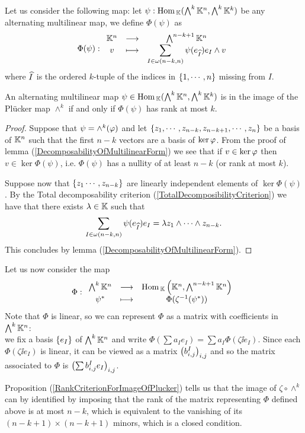 \noindent Let us consider the following map: let $\psi:\mathrm{Hom}\,_{\mathbb{K}}(\bigwedge^k\mathbb{K}^n,\bigwedge^k\mathbb{K}^k)$ be any alternating multilinear map, we define $\Phi(\psi)$ as
\[\Phi(\psi):\begin{array}{ccc} {\mathbb{K}^n} & \longrightarrow & {\bigwedge^{n-k+1}\mathbb{K}^n}\\ {v} & \longmapsto & {\displaystyle\sum_{I\in \omega(n-k,n)}\psi(e_{\widehat{I}})e_I\wedge v} \end{array}\]
where $\widehat{I}$ is the ordered $k$-tuple of the indices in $\left\{{1,\cdots, n}\right\}$ missing from $I$.



\begin{proposition}\label{RankCriterionForImageOfPlucker}
An alternating multilinear map $\psi\in \mathrm{Hom}\,_{\mathbb{K}}(\bigwedge^k\mathbb{K}^n,\bigwedge^k\mathbb{K}^k)$ is in the image of the Pl\"ucker map $\wedge^k$ if and only if $\Phi(\psi)$ has rank at most $k$.
\end{proposition}
\begin{proof}
Suppose that $\psi=\wedge^k(\varphi)$ and let $\left\{{z_1,\cdots, z_{n-k},z_{n-k+1},\cdots, z_{n}}\right\}$ be a basis of $\mathbb{K}^n$ such that the first $n-k$ vectors are a basis of $\ker \varphi$. From the proof of lemma (\ref{DecomposabilityOfMultilinearForm}) we see that if $v\in \ker \varphi$ then $v\in \ker \Phi(\psi)$, i.e. $\Phi(\psi)$ has a nullity of at least $n-k$ (or rank at most $k$).
\medskip

\noindent
Suppose now that $\left\{{z_1\cdots, z_{n-k}}\right\}$ are linearly independent elements of $\ker \Phi(\psi)$. By the Total decomposability criterion (\ref{TotalDecomposibilityCriterion}) we have that there exists $\lambda\in\mathbb{K}$ such that
\[\sum_{I\in \omega(n-k,n)}\psi(e_{\widehat{I}})e_I=\lambda z_1\wedge\cdots \wedge z_{n-k}.\]This concludes by lemma (\ref{DecomposabilityOfMultilinearForm}).
\end{proof}

\noindent Let us now consider the map
\[\Phi:\begin{array}{ccc} {\bigwedge^k\mathbb{K}^n} & \longrightarrow & { \mathrm{Hom}\,_{\mathbb{K}}\left({\mathbb{K}^n,\bigwedge^{n-k+1}\mathbb{K}^n}\right)}\\ {\psi^\ast} & \longmapsto & {\Phi(\zeta^{-1}(\psi^\ast))} \end{array}\]
Note that $\Phi$ is linear, so we can represent $\Phi$ as a matrix with coefficients in $\bigwedge^k\mathbb{K}^n$:\\
we fix a basis $\left\{{e_I}\right\}$ of $\bigwedge^k\mathbb{K}^n$ and write $\Phi(\sum a_I e_I)=\sum a_I \Phi(\zeta\ii e_I)$. Since each $\Phi(\zeta\ii e_I)$ is linear, it can be viewed as a matrix $\left({b_{i,j}^I}\right)_{i,j}$ and so the matrix associated to $\Phi$ is $\left({\sum b_{i,j}^I e_I}\right)_{i,j}$.
\bigskip

\noindent Proposition (\ref{RankCriterionForImageOfPlucker}) tells us that the image of $\zeta\circ\wedge^k$ can by identified by imposing that the rank of the matrix representing $\Phi$ defined above is at most $n-k$, which is equivalent to the vanishing of its $(n-k+1)\times (n-k+1)$ minors, which is a closed condition.\smallskip

